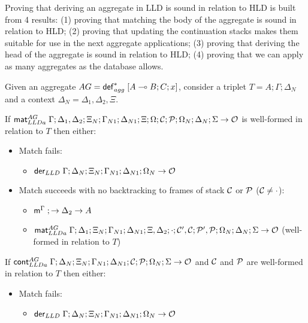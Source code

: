 
Proving that deriving an aggregate in LLD is sound in relation to HLD is
built from 4 results: (1) proving that matching the body of the aggregate is
sound in relation to HLD; (2) proving that updating the continuation stacks
makes them suitable for use in the next aggregate applications; (3) proving
that deriving the head of the aggregate is sound in relation to HLD; (4)
proving that we can apply as many aggregates as the database allows.

\iffalse
\begin{lemma}\label{thm:aggregate_body_match}
Given an aggregate $AG = \mathsf{def}_{agg}^{*} \; [A \multimap B ; C; x]$, consider a triplet $T = A; \Gamma;
\Delta_{N}$ and a context $\Delta_{N} = \Delta_1, \Delta_2, \Xi$.

If $\mathsf{mat}_{LLDa}^{AG} \; \Gamma; \Delta_1, \Delta_2; \Xi_N; \Gamma_{N1}; \Delta_{N1}; \Xi;
\Omega; \mathcal{C}; \mathcal{P}; \Omega_N; \Delta_N; \Sigma \rightarrow \mathcal{O}$ is well-formed in relation to $T$ then either:

\begin{itemize}[leftmargin=*]
   \item Match fails:
   \begin{itemize}[leftmargin=\secondm]
      \item $\mathsf{der}_{LLD} \; \Gamma; \Delta_N; \Xi_N; \Gamma_{N1}; \Delta_{N1}; \Omega_N \rightarrow \mathcal{O}$
   \end{itemize}
   
   \item Match succeeds with no backtracking to frames of stack $\mathcal{C}$
   or $\mathcal{P}$ ($\mathcal{C} \neq \cdot$):

   \begin{itemize}[leftmargin=\secondm]
      \item $\mathsf{m}^{\Gamma} \; ; \rightarrow \Delta_2 \rightarrow A$
      \item $\mathsf{mat}_{LLDa}^{AG} \; \Gamma; \Delta_1; \Xi_N; \Gamma_{N1}; \Delta_{N1}; \Xi,
         \Delta_2; \cdot; \mathcal{C'}, \mathcal{C}; \mathcal{P'}, \mathcal{P};
   \Omega_N; \Delta_N; \Sigma \rightarrow \mathcal{O}$ (well-formed in relation to $T$)
   \end{itemize}

   

\end{itemize}

If $\mathsf{cont}_{LLDa}^{AG} \; \Gamma; \Delta_{N}; \Xi_{N}; \Gamma_{N1}; \Delta_{N1};
\mathcal{C}; \mathcal{P}; \Omega_N; \Sigma \rightarrow \mathcal{O}$ and $\mathcal{C}$ and
$\mathcal{P}$ are well-formed in relation to $T$ then either:

\begin{itemize}[leftmargin=*]
   \item Match fails:
   \begin{itemize}[leftmargin=\secondm]
      \item $\mathsf{der}_{LLD} \; \Gamma; \Delta_N; \Xi_N; \Gamma_{N1}; \Delta_{N1}; \Omega_N \rightarrow \mathcal{O}$
   \end{itemize}

   
   
\end{itemize}
\end{lemma}

